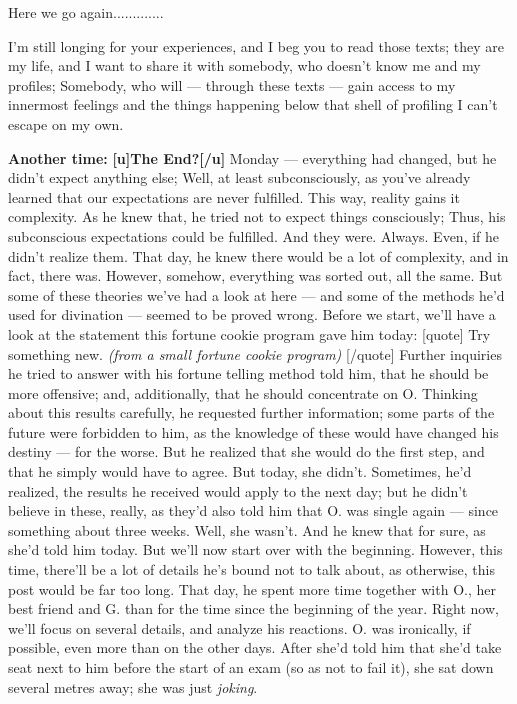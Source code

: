 Here we go again.............

I'm still longing for your experiences, and I beg you to read those texts; they are my life, and I want to share it with somebody, who doesn't know me and my profiles; Somebody, who will --- through these texts --- gain access to my innermost feelings and the things happening below that shell of profiling I can't escape on my own. 

\textbf{Another time:}
\textbf{[u]The End?[/u]}
Monday --- everything had changed, but he didn't expect anything else; Well, at least subconsciously, as you've already learned that our expectations are never fulfilled. 
This way, reality gains it complexity. 
As he knew that, he tried not to expect things consciously; Thus, his subconscious expectations could be fulfilled. 
And they were. 
Always. 
Even, if he didn't realize them. 
That day, he knew there would be a lot of complexity, and in fact, there was. 
However, somehow, everything was sorted out, all the same. 
But some of these theories we've had a look at here --- and some of the methods he'd used for divination --- seemed to be proved wrong. 
Before we start, we'll have a look at the statement this fortune cookie program gave him today: 
[quote]
Try something new. 
\emph{(from a small fortune cookie program)}
[/quote]
Further inquiries he tried to answer with his fortune telling method told him, that he should be more offensive; and, additionally, that he should concentrate on O. 
Thinking about this results carefully, he requested further information; some parts of the future were forbidden to him, as the knowledge of these would have changed his destiny --- for the worse. 
But he realized that she would do the first step, and that he simply would have to agree. 
But today, she didn't. 
Sometimes, he'd realized, the results he received would apply to the next day; but he didn't believe in these, really, as they'd also told him that O. was single again --- since something about three weeks. 
Well, she wasn't. 
And he knew that for sure, as she'd told him today. 
But we'll now start over with the beginning. 
However, this time, there'll be a lot of details he's bound not to talk about, as otherwise, this post would be far too long. 
That day, he spent more time together with O., her best friend and G. than for the time since the beginning of the year. 
Right now, we'll focus on several details, and analyze his reactions. 
O. was ironically, if possible, even more than on the other days. After she'd told him that she'd take seat next to him before the start of an exam (so as not to fail it), she sat down several metres away; she was just \emph{joking}. 
